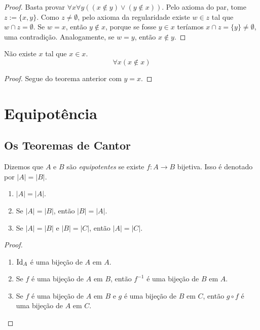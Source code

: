 \begin{proof}
    Basta provar $\forall x \forall y ((x \notin y) \lor (y \notin x))$. Pelo axioma do par, tome $z := \{ x,y \}$. Como $z \neq \emptyset$, pelo axioma da regularidade existe $w \in z$ tal que $w \cap z = \emptyset$. Se $w = x$, então $y \notin x$, porque se fosse $y \in x$ teríamos $x \cap z = \{ y\} \neq \emptyset$, uma contradição. Analogamente, se $w = y$, então $x \notin y$. \blackproof
\end{proof}

\begin{corollary} \label{cor.set:xnotinx}
    Não existe $x$ tal que $x \in x$.
        \[
            \forall x(x \notin x)
        \]
\end{corollary}

\begin{proof}
    Segue do teorema anterior com $y = x$. \blackproof
\end{proof}

\section{Equipotência}

\subsection{Os Teoremas de Cantor}

\begin{definition}
    Dizemos que $A$ e $B$ são \emph{equipotentes} se existe $f : A \to B$ bijetiva. Isso é denotado por $|A| = |B|$.
\end{definition}

\begin{proposition}
    \leavevmode
        \begin{enumerate}[leftmargin=*, align=left, label=\textbf{(\alph*)}]
            \item $|A| = |A|$.
            \item Se $|A| = |B|$, então $|B| = |A|$.
            \item Se $|A| = |B|$ e $|B| = |C|$, então $|A| = |C|$.
        \end{enumerate}
\end{proposition}

\begin{proof}
    \leavevmode
        \begin{enumerate}[leftmargin=*, align=left, label=\textbf{(\alph*)}]
            \item $\operatorname{Id}_A$ é uma bijeção de $A$ em $A$. \blackproof
            \item Se $f$ é uma bijeção de $A$ em $B$, então $f^{-1}$ é uma bijeção de $B$ em $A$. \blackproof
            \item Se $f$ é uma bijeção de $A$ em $B$ e $g$ é uma bijeção de $B$ em $C$, então $g \circ f$ é uma bijeção de $A$ em $C$. \blackproof
        \end{enumerate}
\end{proof}

